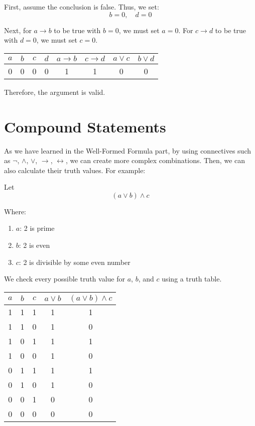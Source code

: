 \documentclass[12pt,a4paper,openany]{article}
\begin{document}
First, assume the conclusion is false. Thus, we set:
$$ b = 0, \quad d = 0 $$

Next, for $a \rightarrow b$ to be true with $b = 0$, we must set $a = 0$.
For $c \rightarrow d$ to be true with $d = 0$, we must set $c = 0$.

\begin{center}
\begin{tabular}{|c|c|c|c|c|c|c|c|}
\hline
$a$ & $b$ & $c$ & $d$ & $a \rightarrow b$ & $c \rightarrow d$ & $a \lor c$ & $b \lor d$ \\
\hline
\textcolor{falsecolor}{0} & \textcolor{falsecolor}{0} & \textcolor{falsecolor}{0} & \textcolor{falsecolor}{0} & \textcolor{truecolor}{1} & \textcolor{truecolor}{1} & \textcolor{falsecolor}{0} & \textcolor{falsecolor}{0} \\
\hline
\end{tabular}
\end{center}

Therefore, the argument is valid.


\section{Compound Statements}

As we have learned in the Well-Formed Formula part, by using
connectives such as \(\neg\), \(\land\), \(\lor\), \(\rightarrow\),
\(\leftrightarrow\), we can create more complex combinations. Then, we
can also calculate their truth values. For example:


Let
\[
(a \lor b) \land c
\]

Where:

\begin{enumerate}[label={}, left=0pt]
\item $a$: 2 is prime
\item $b$: 2 is even
\item $c$: 2 is divisible by some even number
\end{enumerate}

We check every possible truth value for \(a\), \(b\), and \(c\) using a truth table.

\begin{center}
\begin{tabular}{|c|c|c|c|c|}
\hline
\(a\) & \(b\) & \(c\) & \(a \lor b\) & \((a \lor b) \land c\) \\
\hline
1 & 1 & 1 & 1 & 1 \\
1 & 1 & 0 & 1 & 0 \\
1 & 0 & 1 & 1 & 1 \\
1 & 0 & 0 & 1 & 0 \\
0 & 1 & 1 & 1 & 1 \\
0 & 1 & 0 & 1 & 0 \\
0 & 0 & 1 & 0 & 0 \\
0 & 0 & 0 & 0 & 0 \\
\hline
\end{tabular}
\end{center}
\end{document}

